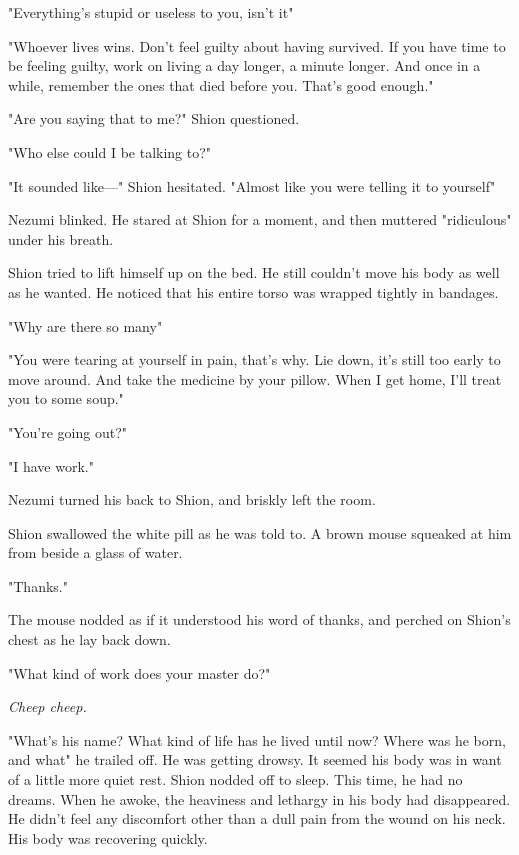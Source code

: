 "Everything's stupid or useless to you, isn't it\el "~

"Whoever lives wins. Don't feel guilty about having survived. If you
have time to be feeling guilty, work on living a day longer, a minute
longer. And once in a while, remember the ones that died before you.
That's good enough."

"Are you saying that to me?" Shion questioned.

"Who else could I be talking to?"

"It sounded like---" Shion hesitated. "Almost like you were telling it to
yourself\el "

Nezumi blinked. He stared at Shion for a moment, and then muttered
"ridiculous" under his breath.~

Shion tried to lift himself up on the bed. He still couldn't move his
body as well as he wanted. He noticed that his entire torso was wrapped
tightly in bandages.

"Why are there so many\el "

"You were tearing at yourself in pain, that's why. Lie down, it's still
too early to move around. And take the medicine by your pillow. When I
get home, I'll treat you to some soup."

"You're going out?"

"I have work."

Nezumi turned his back to Shion, and briskly left the room.

Shion swallowed the white pill as he was told to. A brown mouse squeaked
at him from beside a glass of water.

"Thanks."

The mouse nodded as if it understood his word of thanks, and perched on
Shion's chest as he lay back down.

"What kind of work does your master do?"

\emph{Cheep cheep.}

"What's his name? What kind of life has he lived until now? Where was he
born, and what\el " he trailed off. He was getting drowsy. It seemed his
body was in want of a little more quiet rest. Shion nodded off to sleep.
This time, he had no dreams. When he awoke, the heaviness and lethargy
in his body had disappeared. He didn't feel any discomfort other than a
dull pain from the wound on his neck. His body was recovering quickly.

